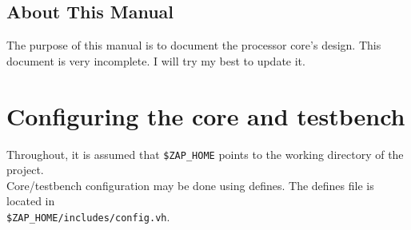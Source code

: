\documentclass[11pt]{article}
\begin{document}

\subsection{About This Manual}

The purpose of this manual is to document the processor core's design. This
document is very incomplete. I will try my best to update it.

\pagebreak
\section{Configuring the core and testbench}

Throughout, it is assumed that \texttt{\$ZAP\_HOME} points to the working
directory of the project.\\
Core/testbench configuration may be done using defines. The defines file is 
located in \\
\texttt{\$ZAP\_HOME/includes/config.vh}. \\
\end{document}
